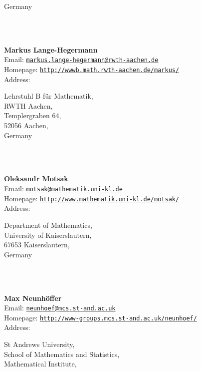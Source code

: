 \documentclass[a4paper,11pt]{report}
\begin{document}
\begin{titlepage}
{\begin{minipage}[t]{8cm}
 Germany \end{minipage}
}\\
{\mbox{}\\
\small \noindent \textbf{Markus Lange-Hegermann\\
    }  Email: \href{mailto://markus.lange-hegermann@rwth-aachen.de} {\texttt{markus.lange-hegermann@rwth-aachen.de}}\\
  Homepage: \href{http://wwwb.math.rwth-aachen.de/~markus/} {\texttt{http://wwwb.math.rwth-aachen.de/\texttt{}markus/}}\\
  Address: \begin{minipage}[t]{8cm}\noindent
 Lehrstuhl B f{\"u}r Mathematik, \\
 RWTH Aachen, \\
 Templergraben 64, \\
 52056 Aachen, \\
 Germany \end{minipage}
}\\
{\mbox{}\\
\small \noindent \textbf{Oleksandr Motsak\\
    }  Email: \href{mailto://motsak@mathematik.uni-kl.de} {\texttt{motsak@mathematik.uni-kl.de}}\\
  Homepage: \href{http://www.mathematik.uni-kl.de/~motsak/} {\texttt{http://www.mathematik.uni-kl.de/\texttt{}motsak/}}\\
  Address: \begin{minipage}[t]{8cm}\noindent
 Department of Mathematics, \\
 University of Kaiserslautern, \\
 67653 Kaiserslautern, \\
 Germany \end{minipage}
}\\
{\mbox{}\\
\small \noindent \textbf{Max Neunh{\"o}ffer\\
    }  Email: \href{mailto://neunhoef@mcs.st-and.ac.uk} {\texttt{neunhoef@mcs.st-and.ac.uk}}\\
  Homepage: \href{http://www-groups.mcs.st-and.ac.uk/~neunhoef/} {\texttt{http://www-groups.mcs.st-and.ac.uk/\texttt{}neunhoef/}}\\
  Address: \begin{minipage}[t]{8cm}\noindent
 St Andrews University, \\
 School of Mathematics and Statistics, \\
 Mathematical Institute, \\

\end{minipage}}
\end{titlepage}
\end{document}
